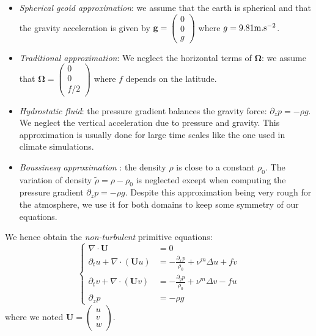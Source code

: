 \begin{itemize}
\item \textit{Spherical geoid approximation}:
we assume that the earth is spherical and that the
gravity acceleration is given by
$\mathbf{g} =\begin{pmatrix}
0\\ 0 \\ g
\end{pmatrix}$ where $g=9.81 {\rm m}.{\rm s}^{-2}$.
\item \textit{Traditional approximation}:
We neglect the horizontal terms of
$\mathbf{\Omega}$: we assume that
$\mathbf{\Omega} =\begin{pmatrix}
0\\ 0 \\ f/2
\end{pmatrix}$ where $f$ depends on the latitude.
\item \textit{Hydrostatic fluid}:
the pressure gradient balances the gravity force:
$\partial_z p = -\rho g$. We neglect the vertical
acceleration due to pressure and gravity.
This approximation is usually done for large time
scales like the one used in climate simulations.
\item \textit{Boussinesq approximation}
\citep{boussinesq_theorie_1903}:
the density $\rho$ is close to a constant $\rho_0$.
The variation of density $\widetilde{\rho} =
\rho - \rho_0$ is neglected except when computing
the pressure gradient $\partial_z p = - \rho g$.
Despite this approximation being very rough
for the atmosphere, we use it for both domains
to keep some symmetry of our equations.
\end{itemize}
We hence obtain the \textit{non-turbulent}
primitive equations:
\begin{equation}
	\label{eq:airseaSCM_nonTurbulentPrimitiveEq}
\begin{cases}
	\nabla \cdot \mathbf{U} &= 0 \\
	\partial_t u + \nabla \cdot (\mathbf{U} u) &=
	- \frac{\partial_x p}{\rho_0} + \nu^m \Delta u
	+ f v \\
	\partial_t v + \nabla \cdot (\mathbf{U} v) &=
	- \frac{\partial_y p}{\rho_0} + \nu^m \Delta v
	- f u \\
	\partial_z p &= -\rho g
\end{cases}
\end{equation}
where we noted $\mathbf{U} = \begin{pmatrix}u\\v\\w\end{pmatrix}$.
